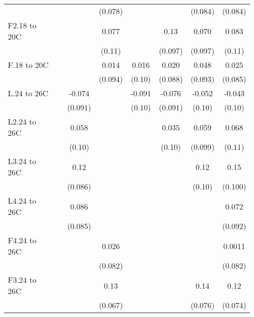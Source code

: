 \documentclass[paper=letterpaper, fontsize=11pt]{article} %
\begin{document}
{\begin{landscape}
\begin{longtable}{l*{7}{c}}
                    &            &            &     (0.078)&            &            &     (0.084)&     (0.084)\\
F2.18 to 20C        &            &            &       0.077&            &        0.13&       0.070&       0.083\\
                    &            &            &      (0.11)&            &     (0.097)&     (0.097)&      (0.11)\\
F.18 to 20C         &            &            &       0.014&       0.016&       0.020&       0.048&       0.025\\
                    &            &            &     (0.094)&      (0.10)&     (0.088)&     (0.093)&     (0.085)\\
L.24 to 26C         &            &      -0.074&            &      -0.091&      -0.076&      -0.052&      -0.043\\
                    &            &     (0.091)&            &      (0.10)&     (0.091)&      (0.10)&      (0.10)\\
L2.24 to 26C        &            &       0.058&            &            &       0.035&       0.059&       0.068\\
                    &            &      (0.10)&            &            &      (0.10)&     (0.099)&      (0.11)\\
L3.24 to 26C        &            &        0.12&            &            &            &        0.12&        0.15\\
                    &            &     (0.086)&            &            &            &      (0.10)&     (0.100)\\
L4.24 to 26C        &            &       0.086&            &            &            &            &       0.072\\
                    &            &     (0.085)&            &            &            &            &     (0.092)\\
F4.24 to 26C        &            &            &       0.026&            &            &            &      0.0011\\
                    &            &            &     (0.082)&            &            &            &     (0.082)\\
F3.24 to 26C        &            &            &        0.13&            &            &        0.14&        0.12\\
                    &            &            &     (0.067)&            &            &     (0.076)&     (0.074)\\

\end{longtable}
\end{landscape}}
\end{document}
